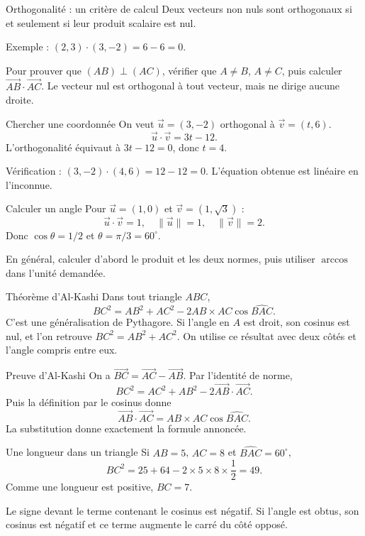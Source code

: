 \documentclass[aspectratio=169,12pt]{beamer}
\begin{document}
\renewcommand{\slidekind}{MÉTHODE \& EXEMPLE}
\begin{frame}[t,fragile]{Orthogonalité : un critère de calcul}
Deux vecteurs non nuls sont orthogonaux si et seulement si leur produit scalaire est nul.\medskip\par Exemple : $(2,3)\cdot(3,-2)=6-6=0$.\medskip\par Pour prouver que $(AB)\perp(AC)$, vérifier que $A\ne B$, $A\ne C$, puis calculer $\overrightarrow{AB}\cdot\overrightarrow{AC}$. Le vecteur nul est orthogonal à tout vecteur, mais ne dirige aucune droite.
\end{frame}
\renewcommand{\slidekind}{COMPRENDRE}
\begin{frame}[t,fragile]{Chercher une coordonnée}
On veut $\vec u=(3,-2)$ orthogonal à $\vec v=(t,6)$.\[\vec u\cdot\vec v=3t-12.\]L’orthogonalité équivaut à $3t-12=0$, donc $t=4$.\medskip\par Vérification : $(3,-2)\cdot(4,6)=12-12=0$. L’équation obtenue est linéaire en l’inconnue.
\end{frame}
\renewcommand{\slidekind}{MÉTHODE \& EXEMPLE}
\begin{frame}[t,fragile]{Calculer un angle}
Pour $\vec u=(1,0)$ et $\vec v=(1,\sqrt3)$ :\[\vec u\cdot\vec v=1,\quad\|\vec u\|=1,\quad\|\vec v\|=2.\]Donc $\cos\theta=1/2$ et $\theta=\pi/3=60^\circ$.\medskip\par En général, calculer d’abord le produit et les deux normes, puis utiliser $\arccos$ dans l’unité demandée.
\end{frame}
\renewcommand{\slidekind}{COMPRENDRE}
\begin{frame}[t,fragile]{Théorème d’Al-Kashi}
Dans tout triangle $ABC$,\[\boxed{BC^2=AB^2+AC^2-2AB\times AC\cos\widehat{BAC}}.\]C’est une généralisation de Pythagore. Si l’angle en $A$ est droit, son cosinus est nul, et l’on retrouve $BC^2=AB^2+AC^2$. On utilise ce résultat avec deux côtés et l’angle compris entre eux.
\end{frame}
\renewcommand{\slidekind}{JUSTIFIER}
\begin{frame}[t,fragile]{Preuve d’Al-Kashi}
On a $\overrightarrow{BC}=\overrightarrow{AC}-\overrightarrow{AB}$. Par l’identité de norme,\[BC^2=AC^2+AB^2-2\overrightarrow{AB}\cdot\overrightarrow{AC}.\]Puis la définition par le cosinus donne\[\overrightarrow{AB}\cdot\overrightarrow{AC}=AB\times AC\cos\widehat{BAC}.\]La substitution donne exactement la formule annoncée.
\end{frame}
\renewcommand{\slidekind}{COMPRENDRE}
\begin{frame}[t,fragile]{Une longueur dans un triangle}
Si $AB=5$, $AC=8$ et $\widehat{BAC}=60^\circ$,\[BC^2=25+64-2\times5\times8\times\frac12=49.\]Comme une longueur est positive, $BC=7$.\medskip\par Le signe devant le terme contenant le cosinus est négatif. Si l’angle est obtus, son cosinus est négatif et ce terme augmente le carré du côté opposé.
\end{frame}
\end{document}
